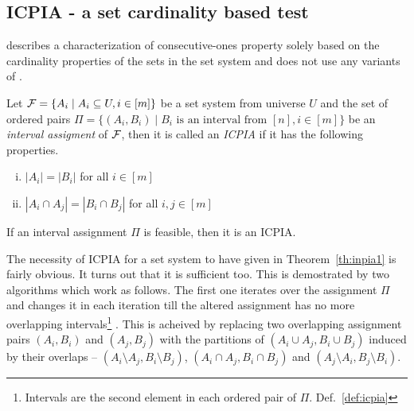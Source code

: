


\subsection{ICPIA - a set cardinality based \COP test}

\cite{nsnrs09} describes a characterization of consecutive-ones
property solely based on the cardinality properties of the sets in the
set system and does not use any variants of \PQtrees. 

\begin{definition}
  \label{def:icpia}
  Let ${\cal F} = \{A_i \mid A_i \subseteq U, i \in [m]\}$ be a set system
  from universe $U$ and the set of ordered pairs $\Pi = \{(A_i, B_i)
  \mid B_i  \text{ is an interval from } [n], i \in [m]\}$ be an {\em interval
    assigment} of ${\cal F}$, then it is called an {\em ICPIA} if it has
  the following properties.
  \begin{enumerate}[i.]
  \item $|A_i| = |B_i|$ for all $i \in [m]$
  \item $|A_i \cap A_j| = |B_i \cap B_j|$ for all $i, j \in [m]$
  \end{enumerate}
\end{definition}

\begin{theoremsansproof}
  \label{th:icpia1}
  If an interval assignment $\Pi$ is feasible, then it is an ICPIA.
\end{theoremsansproof}

The necessity of ICPIA for a set system to have \COP given in
Theorem~\ref{th:inpia1} is fairly obvious. It turns out that it is
sufficient too.  This is demostrated by two algorithms which work as
follows. The first one iterates over the assignment
$\Pi$ %
and changes it in each iteration till the altered
assignment %
has no more overlapping intervals\footnote{Intervals are the second
  element in each ordered pair of $\Pi$. Def.~\ref{def:icpia}} %
\cite[Alg.~1]{nsnrs09}. This is acheived by replacing two overlapping
assignment pairs $(A_i, B_i)$ and $(A_j, B_j)$ with the partitions of
$(A_i \cup A_j,B_i \cup B_j)$ induced by their overlaps -- $(A_i
\setminus A_j, B_i \setminus B_j)$, $(A_i \cap A_j, B_i \cap B_j)$ and
$(A_j \setminus A_i, B_j \setminus B_i)$.

